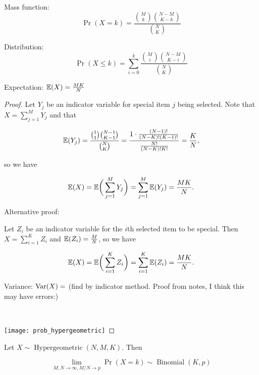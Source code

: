 \begin{itemize}

\item Mass function: \[\Pr(X = k) = \frac{\binom{M}{k} \binom{N-M}{K-k}}{\binom{N}{K}} \]

\item Distribution: \[\Pr(X \leq k) = \sum_{i=0}^k \frac{\binom{M}{i} \binom{N-M}{K-i}}{\binom{N}{K}}  \]

\item Expectation: \(\E(X) = \frac{MK}{N}\)

\begin{proof}Let \(Y_j\) be an indicator variable for special item \(j\) being selected. Note that \(X = \sum_{j=1}^M Y_j\) and that 

\[
\E(Y_j) =  \frac{\binom{1}{1} \binom{N-1}{K-1}}{\binom{N}{K}} = \frac{1 \cdot \frac{(N-1)!}{(N-K)!(K-1)!}}{\frac{N!}{(N-K)!K!}} = \frac{K}{N} ,
\]

so we have

\[
\E(X) = \E \bigg( \sum_{j=1}^M Y_j \bigg) = \sum_{j=1}^M  \E(Y_j ) = \frac{MK}{N}.
\]

Alternative proof:

Let \(Z_i\) be an indicator variable for the \(i\)th selected item to be special. Then \(X = \sum_{i=1}^K Z_i\) and \(\E(Z_i) = \frac{M}{N}\), so we have

\[
\E(X) = \E \bigg( \sum_{i=1}^K Z_i \bigg) = \sum_{i=1}^K  \E(Z_i) = \frac{MK}{N}.
\]

\item Variance: \(\Var(X) = \) (find by indicator method. Proof from notes, I think this may have errors:)

\

\texttt{[image: prob\_hypergeometric]}
\end{proof}

\end{itemize}

\begin{proposition}Let \(X \sim \operatorname{Hypergeometric}(N, M, K)\). Then

\[
\lim_{M, N \to \infty, M/N \to p} \Pr(X=k) \sim \operatorname{Binomial}(K, p)
\]

\end{proposition}

